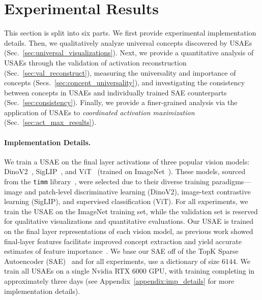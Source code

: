 \vspace{-3mm}
\section{Experimental Results}
\vspace{-1mm}
This section is split into six parts. We first provide experimental implementation details. Then, we qualitatively analyze universal concepts discovered by USAEs (Sec.~\ref{sec:universal_visualizations}). Next, we provide a quantitative analysis of USAEs through the validation of activation reconstruction (Sec.~\ref{sec:val_reconstruct}), measuring the universality and importance of concepts (Secs.~\ref{sec:concept_universality}), and investigating the consistency between concepts in USAEs and individually trained SAE counterparts (Sec.~\ref{sec:consistency}). Finally, we provide a finer-grained analysis via the application of USAEs to \textit{coordinated activation maximization} (Sec.~\ref{sec:act_max_results}).

\vspace{-2mm}
\paragraph{Implementation Details.} 
We train a USAE on the final layer activations of three popular vision models: DinoV2~\cite{oquab2023dinov2,darcet2023vision}, SigLIP~\cite{zhai2023sigmoid}, and ViT~\cite{dosovitskiy2020image} (trained on ImageNet~\cite{deng2009imagenet}). These models, sourced from the \texttt{timm} library~\cite{wightman2019pytorch}, were selected due to their diverse training paradigms—image and patch-level discriminative learning (DinoV2), image-text contrastive learning (SigLIP), and supervised classification (ViT).
For all experiments, we train the USAE on the ImageNet training set, while the validation set is reserved for qualitative visualizations and quantitative evaluations. 
Our USAE is trained on the final layer representations of each vision model, as previous work showed final-layer features facilitate improved concept extraction and yield accurate estimates of feature importance~\cite{fel2023holistic}. We base our SAE off of the TopK Sparse Autoencoder (SAE)~\cite{gao2024scaling} and for all experiments, use a dictionary of size $6144$. We train all USAEs on a single Nvidia RTX 6000 GPU, with training completing in approximately three days (see Appendix~\ref{appendix:imp_details} for more implementation details).



